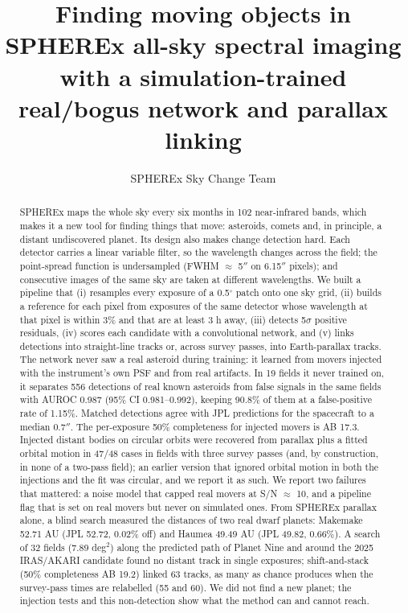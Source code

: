 \documentclass[twocolumn]{aastex631}
\begin{document}
\title{Finding moving objects in SPHEREx all-sky spectral imaging with a simulation-trained real/bogus network and parallax linking}
\author{SPHEREx Sky Change Team}
\begin{abstract}
SPHEREx maps the whole sky every six months in 102 near-infrared bands, which makes it a new tool for finding things that move: asteroids, comets and, in principle, a distant undiscovered planet. Its design also makes change detection hard. Each detector carries a linear variable filter, so the wavelength changes across the field; the point-spread function is undersampled (FWHM $\approx$ 5$''$ on 6.15$''$ pixels); and consecutive images of the same sky are taken at different wavelengths. We built a pipeline that (i) resamples every exposure of a 0.5$^\circ$ patch onto one sky grid, (ii) builds a reference for each pixel from exposures of the same detector whose wavelength at that pixel is within 3\% and that are at least 3 h away, (iii) detects 5$\sigma$ positive residuals, (iv) scores each candidate with a convolutional network, and (v) links detections into straight-line tracks or, across survey passes, into Earth-parallax tracks. The network never saw a real asteroid during training: it learned from movers injected with the instrument's own PSF and from real artifacts. In 19 fields it never trained on, it separates 556 detections of real known asteroids from false signals in the same fields with AUROC 0.987 (95\% CI 0.981--0.992), keeping 90.8\% of them at a false-positive rate of 1.15\%. Matched detections agree with JPL predictions for the spacecraft to a median 0.7$''$. The per-exposure 50\% completeness for injected movers is AB 17.3. Injected distant bodies on circular orbits were recovered from parallax plus a fitted orbital motion in 47/48 cases in fields with three survey passes (and, by construction, in none of a two-pass field); an earlier version that ignored orbital motion in both the injections and the fit was circular, and we report it as such. We report two failures that mattered: a noise model that capped real movers at S/N $\approx$ 10, and a pipeline flag that is set on real movers but never on simulated ones. From SPHEREx parallax alone, a blind search measured the distances of two real dwarf planets: Makemake 52.71 AU (JPL 52.72, 0.02\% off) and Haumea 49.49 AU (JPL 49.82, 0.66\%). A search of 32 fields (7.89 deg$^2$) along the predicted path of Planet Nine and around the 2025 IRAS/AKARI candidate found no distant track in single exposures; shift-and-stack (50\% completeness AB 19.2) linked 63 tracks, as many as chance produces when the survey-pass times are relabelled (55 and 60). We did not find a new planet; the injection tests and this non-detection show what the method can and cannot reach.


\end{abstract}
\end{document}
